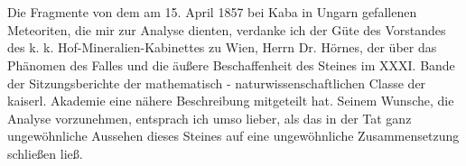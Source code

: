 \documentclass[a4paper, 11pt, oneside]{article}
\begin{document}
\setlength{\parskip}{1mm plus1mm minus1mm}
\clearpage
\tableofcontents
\clearpage
\LARGE
\pagestyle{fancy}
\fancyhf{}
\cfoot{\swabfamily{\thepage}}
\section{}
\paragraph{}
Die Fragmente von dem am 15. April 1857 bei Kaba in Ungarn gefallenen Meteoriten, die mir zur Analyse dienten, verdanke ich der Güte des Vorstandes des k. k. Hof-Mineralien-Kabinettes zu Wien, Herrn Dr. Hörnes, der über das Phänomen des Falles und die äußere Beschaffenheit des Steines im XXXI. Bande der Sitzungsberichte der mathematisch - naturwissenschaftlichen Classe der kaiserl. Akademie eine nähere Beschreibung mitgeteilt hat. Seinem Wunsche, die Analyse vorzunehmen, entsprach ich umso lieber, als das in der Tat ganz ungewöhnliche Aussehen dieses Steines auf eine ungewöhnliche Zusammensetzung schließen ließ.
\end{document}
